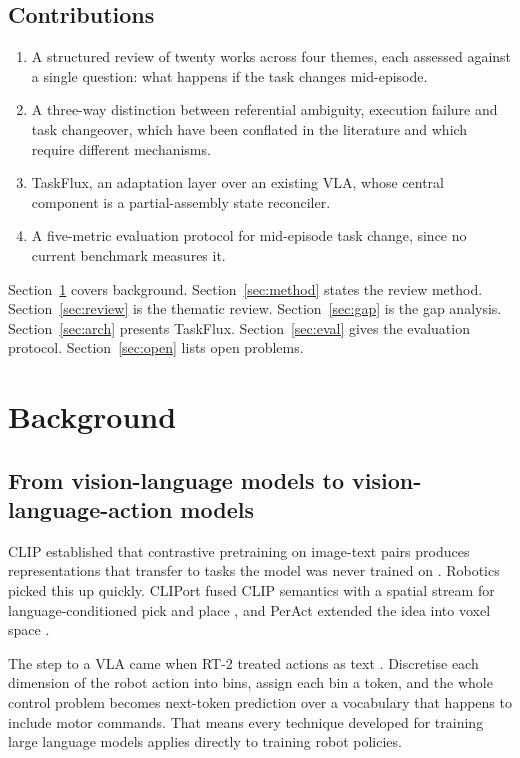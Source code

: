 \documentclass[conference]{IEEEtran}
\begin{document}
\subsection{Contributions}

\begin{enumerate}
\item A structured review of twenty works across four themes, each
assessed against a single question: what happens if the task changes
mid-episode.
\item A three-way distinction between referential ambiguity, execution
failure and task changeover, which have been conflated in the literature
and which require different mechanisms.
\item TaskFlux, an adaptation layer over an existing VLA, whose central
component is a partial-assembly state reconciler.
\item A five-metric evaluation protocol for mid-episode task change,
since no current benchmark measures it.
\end{enumerate}

Section~\ref{sec:background} covers background. Section~\ref{sec:method}
states the review method. Section~\ref{sec:review} is the thematic
review. Section~\ref{sec:gap} is the gap analysis.
Section~\ref{sec:arch} presents TaskFlux. Section~\ref{sec:eval} gives
the evaluation protocol. Section~\ref{sec:open} lists open problems.

\section{Background}
\label{sec:background}

\subsection{From vision-language models to vision-language-action models}

CLIP established that contrastive pretraining on image-text pairs
produces representations that transfer to tasks the model was never
trained on \cite{clip}. Robotics picked this up quickly. CLIPort fused
CLIP semantics with a spatial stream for language-conditioned pick and
place \cite{cliport}, and PerAct extended the idea into voxel space
\cite{peract}.

The step to a VLA came when RT-2 treated actions as text \cite{rt2}.
Discretise each dimension of the robot action into bins, assign each bin
a token, and the whole control problem becomes next-token prediction over
a vocabulary that happens to include motor commands. That means every
technique developed for training large language models applies directly
to training robot policies.
\end{document}
